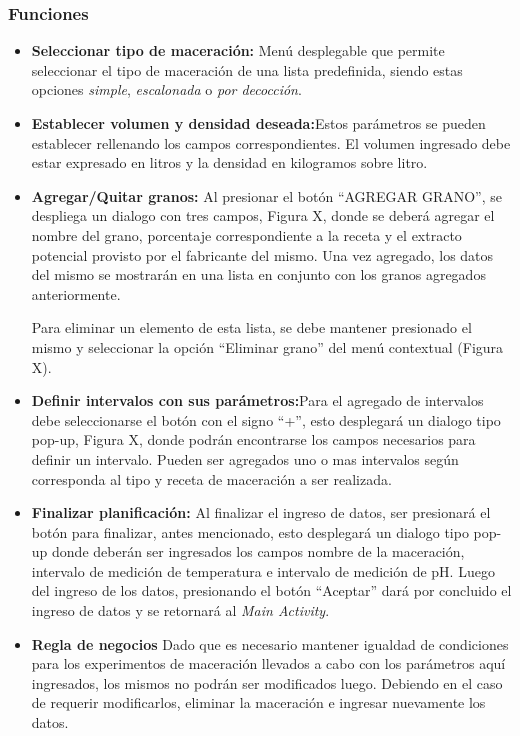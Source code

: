             \subsubsection{Funciones}
                \begin{itemize}
                    \item \textbf{Seleccionar tipo de maceración:} Menú desplegable que permite seleccionar el tipo de maceración de una lista predefinida, siendo estas opciones \textit{simple}, \textit{escalonada} o \textit{por decocción}.
                    
                    \item \textbf{Establecer volumen y densidad deseada:}Estos parámetros se pueden establecer rellenando los campos correspondientes. El volumen ingresado debe estar expresado en litros y la densidad en kilogramos sobre litro.
                    
                    \item \textbf{Agregar/Quitar granos:} Al presionar el botón ``AGREGAR GRANO'', se despliega un dialogo con tres campos, Figura X,  donde se deberá agregar el nombre del grano, porcentaje correspondiente a la receta y el extracto potencial provisto por el fabricante del mismo. Una vez agregado, los datos del mismo se mostrarán en una lista en conjunto con los granos agregados anteriormente.
                    
                        \par Para eliminar un elemento de esta lista, se debe mantener presionado el mismo y seleccionar la opción ``Eliminar grano'' del menú contextual (Figura X).
                    
                    \item \textbf{Definir intervalos con sus parámetros:}Para el agregado de intervalos debe seleccionarse el botón con el signo ``+'', esto desplegará un dialogo tipo pop-up, Figura X, donde podrán encontrarse los campos necesarios para definir un intervalo. Pueden ser agregados uno o mas intervalos según corresponda al tipo y receta de maceración a ser realizada.
                    
                    \item \textbf{Finalizar planificación:} Al finalizar el ingreso de datos, ser presionará el botón para finalizar, antes mencionado, esto desplegará un dialogo tipo pop-up donde deberán ser ingresados los campos nombre de la maceración, intervalo de medición de temperatura e intervalo de medición de pH. Luego del ingreso de los datos, presionando el botón ``Aceptar'' dará por concluido el ingreso de datos y se retornará al \textit{Main Activity}.
                    
                    \item \textbf{Regla de negocios} Dado que es necesario mantener igualdad de condiciones para los experimentos de maceración llevados a cabo con los parámetros aquí ingresados, los mismos no podrán ser modificados luego. Debiendo en el caso de requerir modificarlos, eliminar la maceración e ingresar nuevamente los datos.
                \end{itemize}
            
